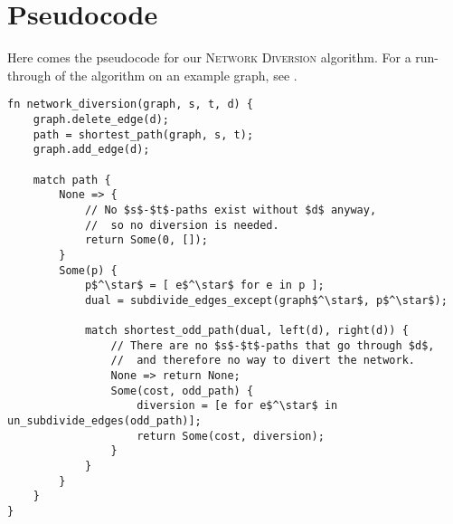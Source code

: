 \section{Pseudocode}
Here comes the pseudocode for our \textsc{Network Diversion} algorithm. For a run-through of the algorithm on an example graph, see .

\begin{lstlisting}[caption={Main},label=Listing,mathescape=true]
fn network_diversion(graph, s, t, d) {
    graph.delete_edge(d);
    path = shortest_path(graph, s, t);
    graph.add_edge(d);

    match path {
        None => {
            // No $s$-$t$-paths exist without $d$ anyway,
            //  so no diversion is needed.
            return Some(0, []);
        }
        Some(p) {
            p$^\star$ = [ e$^\star$ for e in p ];
            dual = subdivide_edges_except(graph$^\star$, p$^\star$);

            match shortest_odd_path(dual, left(d), right(d)) {
                // There are no $s$-$t$-paths that go through $d$,
                //  and therefore no way to divert the network.
                None => return None;
                Some(cost, odd_path) {
                    diversion = [e for e$^\star$ in un_subdivide_edges(odd_path)];
                    return Some(cost, diversion);
                }
            }
        }
    }
}
\end{lstlisting}
